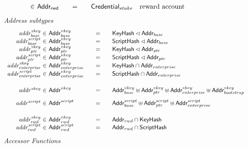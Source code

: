\begin{figure*}[hbt]
\begin{equation*}
\begin{array}{r@{~\in~}l@{\qquad=\qquad}lr}
      & \AddrRWD
      & \Credential_{stake}
      & \text{reward account}
      \\
    \end{array}
  \end{equation*}
  \emph{Address subtypes}
  \begin{equation*}
    \begin{array}{r@{~\in~}l@{\qquad=\qquad}lr}
      \var{addr^{vkey}_{base}}
                 & \Addr^{vkey}_{base}
                               & \KeyHash\restrictdom\Addr_{base}
      \\
      \var{addr^{script}_{base}}
                 & \Addr^{vkey}_{base}
                               & \HashScr\restrictdom\Addr_{base}
      \\
      \var{addr^{vkey}_{ptr}}
                 & \Addr^{vkey}_{ptr}
                               & \KeyHash\restrictdom\Addr_{ptr}
      \\
      \var{addr^{script}_{ptr}}
                 & \Addr^{vkey}_{ptr}
                               & \HashScr\restrictdom\Addr_{ptr}
      \\
      \var{addr^{vkey}_{enterprise}}
                 & \Addr^{vkey}_{enterprise}
                               & \KeyHash\cap\Addr_{enterprise}
      \\
      \var{addr^{script}_{enterprise}}
                 & \Addr^{vkey}_{enterprise}
                               & \HashScr\cap\Addr_{enterprise}
      \\[0.5cm]
      \var{addr^{vkey}} &
             \Addr^{vkey} &
                            \Addr^{vkey}_{base} \uniondistinct \Addr^{vkey}_{ptr} \uniondistinct \Addr^{vkey}_{enterprise} \uniondistinct \Addr^{vkey}_{bootstrap}\\[0.3cm]
      \var{addr^{script}} &
                            \Addr^{script} &
                                             \Addr^{script}_{base}
                                             \uniondistinct \Addr^{script}_{ptr}
                                             \uniondistinct
                                             \Addr^{script}_{enterprise}
      \\[0.5cm]
      \var{addr_{rwd}^{vkey}} & \Addr_{rwd}^{vkey} & \Addr_{rwd}\cap\KeyHash \\
      \var{addr_{rwd}^{script}} & \Addr_{rwd}^{script} & \Addr_{rwd}\cap\HashScr \\
    \end{array}
  \end{equation*}
  \emph{Accessor Functions}

\end{figure*}
